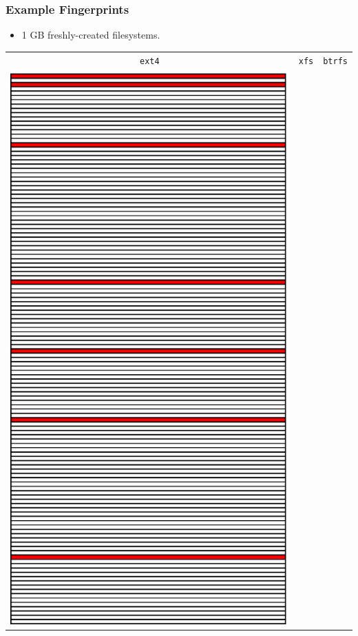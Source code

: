 \documentclass[xcolor={dvipsnames,svgnames},hyperref=dvips]{beamer}
\begin{document}
	\begin{frame}
		\frametitle{Example Fingerprints}
		\centering
		\begin{itemize}
		\item 1 GB freshly-created filesystems.
		\end{itemize}
		\begin{tabular}{c c c}
		\texttt{ext4} & \texttt{xfs} & \texttt{btrfs} \\
		\protect \includegraphics[scale=0.30]{images/fingerprint_ext4.ps} &

\end{tabular}
\end{frame}
\end{document}
